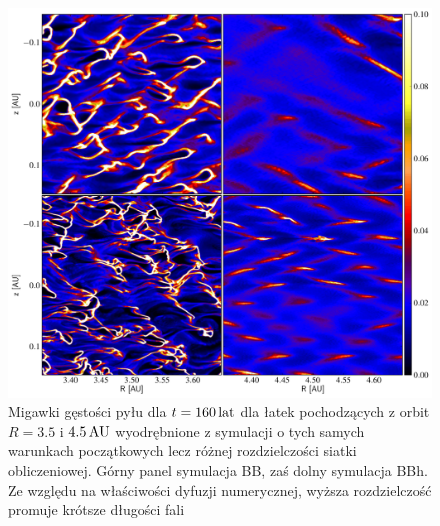 \begin{figure}
   \includegraphics[width=0.98\linewidth]{figures/fig10}
   \caption{Migawki gęstości pyłu dla $t = 160\hbox{$\thinspace\textrm{lat}$}$ dla łatek pochodzących z
      orbit $R=3.5$ i $4.5\hbox{$\thinspace\textrm{AU}$}$ wyodrębnione z symulacji o tych samych warunkach
      początkowych lecz różnej rozdzielczości siatki obliczeniowej. Górny panel
      symulacja BB, zaś dolny symulacja BBh. Ze względu na właściwości
      dyfuzji numerycznej, wyższa rozdzielczość promuje krótsze długości
      fali}
   \label{fig10} 
\end{figure}

